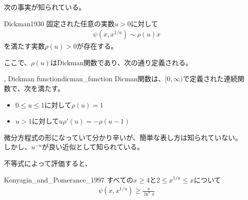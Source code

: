 次の事実が知られている。

\begin{Theo}{\cite{Dickman1930}}{Dickman1930}
固定された任意の実数$u>0$に対して
\begin{align*}
\psi(x, x^{1/u}) \sim \rho(u) x
\end{align*}
を満たす実数$\rho(u)>0$が存在する。
\end{Theo}

ここで、$\rho(u)$はDickman関数であり、次の通り定義される。

\begin{Defi}{, Dickman function}{dicman_function}
Dicman関数は、$[0,\infty)$で定義された連続関数で、次を満たす。
\begin{itemize}
\item $0\le u \le 1$に対して$\rho(u) = 1$
\item $u > 1$に対して$u\rho'(u) = -\rho(u-1)$
\end{itemize}
\end{Defi}

微分方程式の形になっていて分かり辛いが、簡単な表し方は知られていない。
しかし、$u^{-u}$が良い近似として知られている。


不等式によって評価すると、
\begin{Theo}{\cite{Konyagin2013}}{Konyagin_and_Pomerance_1997}
すべての$x\ge4$と$2 \le x^{1/u}\le x$について
\begin{align*}
\psi(x, x^{1/u}) \ge \frac{x}{\ln^u x}
\end{align*}
\end{Theo}

